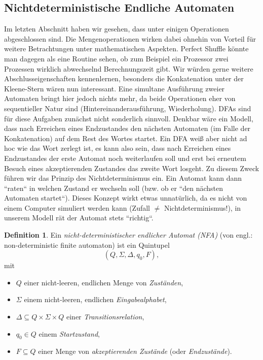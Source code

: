 \documentclass[11pt, a4paper]{article}
\theoremstyle{definition}
\newtheorem{definition}{Definition}[section]
\theoremstyle{plain}
\numberwithin{equation}{section}
\begin{document}
\subsection{Nichtdeterministische Endliche Automaten}\label{sec:regular_nfa}
Im letzten Abschnitt haben wir gesehen, dass unter einigen Operationen abgeschlossen sind. Die Mengenoperationen wirken dabei ohnehin von Vorteil für weitere Betrachtungen unter mathematischen Aspekten. Perfect Shuffle könnte man dagegen als eine Routine sehen, ob zum Beispiel ein Prozessor zwei Prozessen wirklich abwechselnd Berechnungszeit gibt. Wir würden gerne weitere Abschlusseigenschaften kennenlernen, besonders die Konkatenation unter der Kleene-Stern wären nun interessant. Eine simultane Ausführung zweier Automaten bringt hier jedoch nichts mehr, da beide Operationen eher von sequentieller Natur sind (Hintereinanderausführung, Wiederholung). DFAs sind für diese Aufgaben zunächst nicht sonderlich sinnvoll. Denkbar wäre ein Modell, dass nach Erreichen eines Endzustandes den nächsten Automaten (im Falle der Konkatenation) auf dem Rest des Wortes startet. Ein DFA weiß aber nicht ad hoc wie das Wort zerlegt ist, es kann also sein, dass nach Erreichen eines Endzustandes der erste Automat noch weiterlaufen soll und erst bei erneutem Besuch eines akzeptierenden Zustandes das zweite Wort losgeht. Zu diesem Zweck führen wir das Prinzip des Nichtdeterminismus ein. Ein Automat kann dann ``raten`` in welchen Zustand er wechseln soll (bzw. ob er ``den nächsten Automaten startet``). Dieses Konzept wirkt etwas unnatürlich, da es nicht von einem Computer simuliert werden kann (Zufall $\neq$ Nichtdeterminismus!), in unserem Modell rät der Automat stets ``richtig``.
\begin{definition}
	Ein \textit{nicht-deterministischer endlicher Automat (NFA)} (von engl.: non-deterministic finite automaton) ist ein Quintupel
	$$
		(Q, \Sigma, \Delta, q_0, F),
	$$
	mit
	\begin{itemize}
		\item $Q$ einer nicht-leeren, endlichen Menge von \textit{Zuständen},
		\item $\Sigma$ einem nicht-leeren, endlichen \textit{Eingabealphabet},
		\item $\Delta \subseteq Q \times \Sigma \times Q$ einer \textit{Transitionsrelation},
		\item $q_0 \in Q$ einem \textit{Startzustand},
		\item $F \subseteq Q$ einer Menge von \textit{akzeptierenden Zustände} (oder \textit{Endzustände}).
	\end{itemize}
\end{definition}
\end{document}
